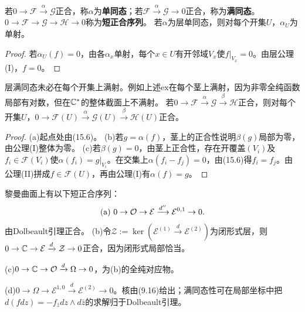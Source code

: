 若$0\to\mathcal F\xrightarrow\alpha\mathcal G$正合，称$\alpha$为\textbf{单同态}；若$\mathcal F\xrightarrow\alpha\mathcal G\to0$正合，称为\textbf{满同态}。$0\to\mathcal F\to\mathcal G\to\mathcal H\to0$称为\textbf{短正合序列}。
若$\alpha$为层单同态，则对每个开集$U$，$\alpha_U$为单射。
\begin{proof}
若$\alpha_U(f)=0$，由各$\alpha_x$单射，每个$x\in U$有开邻域$V_x$使$f|_{V_x}=0$。由层公理(I)，$f=0$。
\end{proof}
层满同态未必在每个开集上满射。例如上述$\mathrm{ex}$在每个茎上满射，因为非零全纯函数局部有对数，但在$\mathbb C^*$的整体截面上不满射。
若$0\to\mathcal F\xrightarrow\alpha\mathcal G\xrightarrow\beta\mathcal H$正合，则对每个开集$U$，$0\to\mathcal F(U)\xrightarrow\alpha\mathcal G(U)\xrightarrow\beta\mathcal H(U)$正合。
\begin{proof}
(a)起点处由(15.6)。
(b)若$g=\alpha(f)$，茎上的正合性说明$\beta(g)$局部为零，由公理(I)整体为零。
(c)若$\beta(g)=0$，由茎上正合性，存在开覆盖$(V_i)$及$f_i\in\mathcal F(V_i)$使$\alpha(f_i)=g|_{V_i}$。在交集上$\alpha(f_i-f_j)=0$，由(15.6)得$f_i=f_j$。由公理(II)拼成$f\in\mathcal F(U)$，再由公理(I)有$\alpha(f)=g$。
\end{proof}
黎曼曲面上有以下短正合序列：
\[
\text{(a) }0\to\mathcal O\to\mathcal E\xrightarrow{d''}\mathcal E^{0,1}\to0.
\]
由Dolbeault引理正合。
(b)令$\mathcal Z:=\ker(\mathcal E^{(1)}\xrightarrow d\mathcal E^{(2)})$为闭形式层，则$0\to\mathbb C\to\mathcal E\xrightarrow d\mathcal Z\to0$正合，因为闭形式局部恰当。

(c)$0\to\mathbb C\to\mathcal O\xrightarrow d\Omega\to0$，为(b)的全纯对应物。

(d)$0\to\Omega\to\mathcal E^{1,0}\xrightarrow d\mathcal E^{(2)}\to0$。核由(9.16)给出；满同态性可在局部坐标中把$d(fdz)=-f_{\bar z}dz\wedge d\bar z$的求解归于Dolbeault引理。

